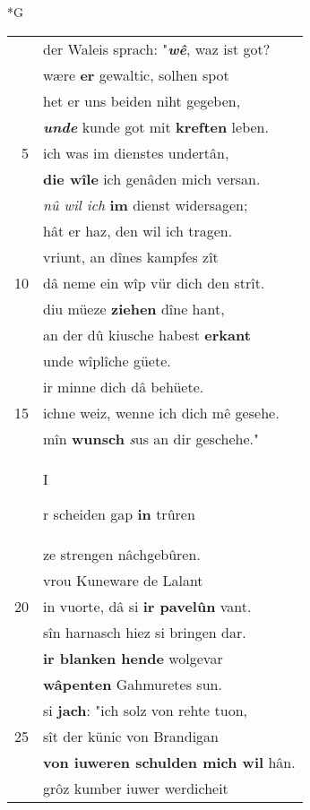 \documentclass[8pt,a4paper,notitlepage]{article}
\begin{document}
\newpage
\begin{table}[ht]
\begin{minipage}[t]{0.5\linewidth}
\small
\begin{center}*G
\end{center}
\begin{tabular}{rl}
 & der Waleis sprach: "\textit{\textbf{wê}}, waz ist got?\\ 
 & wære \textbf{er} gewaltic, solhen spot\\ 
 & het er uns beiden niht gegeben,\\ 
 & \textit{\textbf{unde}} kunde got mit \textbf{kreften} leben.\\ 
5 & ich was im dienstes undertân,\\ 
 & \textbf{die wîle} ich genâden mich versan.\\ 
 & \textit{nû wil ich} \textbf{im} dienst widersagen;\\ 
 & hât er haz, den wil ich tragen.\\ 
 & vriunt, an dînes kampfes zît\\ 
10 & dâ neme ein wîp vür dich den strît.\\ 
 & diu müeze \textbf{ziehen} dîne hant,\\ 
 & an der dû kiusche habest \textbf{erkant}\\ 
 & unde wîplîche güete.\\ 
 & ir minne dich dâ behüete.\\ 
15 & ichne weiz, wenne ich dich mê gesehe.\\ 
 & mîn \textbf{wunsch} \textit{s}us an dir geschehe."\\ 
 & \begin{large}I\end{large}r scheiden gap \textbf{in} trûren\\ 
 & ze strengen nâchgebûren.\\ 
 & vrou Kuneware de Lalant\\ 
20 & in vuorte, dâ si \textbf{ir pavelûn} vant.\\ 
 & sîn harnasch hiez si bringen dar.\\ 
 & \textbf{ir blanken hende} wolgevar\\ 
 & \textbf{wâpenten} Gahmuretes sun.\\ 
 & si \textbf{jach}: "ich solz von rehte tuon,\\ 
25 & sît der künic von Brandigan\\ 
 & \textbf{von iuweren schulden mich wil} hân.\\ 
 & grôz kumber iuwer werdicheit\\ 

\end{tabular}
\end{minipage}
\end{table}
\end{document}
